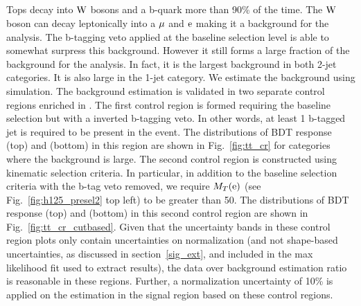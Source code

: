 \subsection{\ttb}
\label{h125_ttb}
Tops decay into $\text{W}$ bosons and a b-quark more than 90\% of the time. The $\text{W}$ boson can decay leptonically into a $\mu$ and $\text{e}$ making it a background for the analysis. The b-tagging veto applied at the baseline selection level is able to somewhat surpress this background. However it still forms a large fraction of the background for the analysis. In fact, it is the largest background in both 2-jet categories. It is also large in the 1-jet category. We estimate the \ttb background using simulation. The background estimation is validated in two separate control regions enriched in \ttb. The first control region is formed requiring the baseline selection but with a inverted b-tagging veto. In other words, at least 1 b-tagged jet is required to be present in the event. The distributions of BDT response (top) and \mcol (bottom) in this region are shown in Fig.~\ref{fig:tt_cr} for categories where the \ttb background is large. The second control region is constructed using kinematic selection criteria. In particular, in addition to the baseline selection criteria with the b-tag veto removed, we require $M_T(\text{e})$ (see Fig.~\ref{fig:h125_presel2} top left) to be greater than 50\GeV. The distributions of BDT response (top) and \mcol (bottom) in this second control region are shown in Fig.~\ref{fig:tt_cr_cutbased}. Given that the uncertainty bands in these control region plots only contain uncertainties on normalization (and not shape-based uncertainties, as discussed in section~\ref{sig_ext}, and included in the max likelihood fit used to extract results), the data over background estimation  ratio is reasonable in these regions. Further, a normalization uncertainty of 10\% is applied on the \ttb estimation in the signal region based on these control regions.


